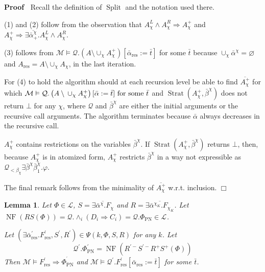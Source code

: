 \documentclass{article}
\newcommand{\assign}{:=}
\newcommand{\tmop}[1]{\ensuremath{\operatorname{#1}}}
\newenvironment{proof}{\noindent\textbf{Proof\ }}{\hspace*{\fill}$\Box$\medskip}
\newtheorem{lemma}{Lemma}
\begin{document}
\begin{proof}
  Recall the definition of $\tmop{Split}$ and the notation used there.
  
  (1) and (2) follow from the observation that $A_{\chi}^L \wedge A^R_{\chi}
  \Rightarrow A_{\chi}^+$ and $A_{\chi}^+ \Rightarrow \exists
  \overline{\bar{\alpha}^{\chi}_+} .A_{\chi}^L \wedge A^R_{\chi}$.
  
  (3) follows from $\mathcal{M} \vDash \mathcal{Q}. (A \setminus \cup_{\chi}
  A_{\chi}^+) [\bar{\alpha}_{\tmop{res}} \assign \bar{t}]$ for some $\bar{t}$
  because $\cup_{\chi} \bar{\alpha}^{\chi} = \varnothing$ and $A_{\tmop{res}}
  = A \setminus \cup_{\chi} A_{\chi}$, in the last iteration.
  
  For (4) to hold the algorithm should at each recursion level be able to find
  $\overline{A_{\chi}^+}$ for which $\mathcal{M} \vDash \mathcal{Q}. \left( A
  \setminus {\nobreak} \cup_{\chi} A_{\chi}^+ \right) [\bar{\alpha} \assign
  \bar{t}] \text{ for some } \bar{t}$ and $\tmop{Strat} (A^+_{\chi},
  \bar{\beta}^{\chi})$ does not return $\bot$ for any $\chi$, where
  $\mathcal{Q}$ and $\bar{\beta}^{\chi}$ are either the initial arguments or
  the recursive call arguments. The algorithm terminates because
  $\bar{\alpha}$ always decreases in the recursive call.
  
  $A_{\chi}^+$ contains restrictions on the variables $\bar{\beta}^{\chi}$. If
  $\tmop{Strat} (A^+_{\chi}, \bar{\beta}^{\chi})$ returns $\bot$, then,
  because $A_{\chi}^+$ is in atomized form, $A_{\chi}^+$ restricts
  $\bar{\beta}^{\chi}$ in a way not expressible as $\mathcal{Q}_{<
  \beta_{\chi}} \exists \bar{\beta}^{\chi} \bar{\beta}^{\chi}_1 . \varphi$.
  
  The final remark follows from the minimality of $\overline{A_{\chi}^+}$
  w.r.t. inclusion.
\end{proof}

\begin{lemma}
  \label{OpCorrectLemma}Let $\Phi \in \mathcal{L}$, $S = \overline{\exists
  \bar{\alpha}^{\chi} .F_{\chi}}$ and $R = \overline{\exists
  \bar{\alpha}^{\chi_K} .F_{\chi_K}}$. Let $\tmop{NF} (RS (\Phi))
  =\mathcal{Q}. \wedge_i (D_i \Rightarrow C_i) =\mathcal{Q}. \Phi_{\tmop{PN}}
  \in \mathcal{L}^{}$.
  
  Let $(\exists \bar{\alpha}_{\tmop{res}}^{\prime} .F_{\tmop{res}}^{\prime},
  S^{\prime}, R^{\prime}) \in \Psi (k, \Phi, S, R)$ for any $k$. Let
  \[ \mathcal{Q}^{\prime} . \Phi_{\tmop{PN}}^{\prime} = \tmop{NF} (R^{\prime
     -} S^{\prime -} R^+ S^+ (\Phi)) \]
  Then $\mathcal{M} \vDash F_{\tmop{res}}^{\prime} \Rightarrow
  \Phi_{\tmop{PN}}^{^{\prime}}$ and $\mathcal{M} \vDash \mathcal{Q}^{\prime}
  .F^{\prime}_{\tmop{res}} [\bar{\alpha}_{\tmop{res}} \assign \bar{t}]$ for
  some $\bar{t}$.
\end{lemma}
\end{document}
